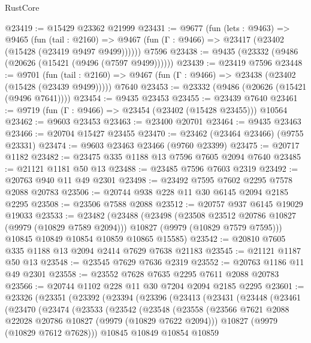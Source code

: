 \begin{lexlean}{RustCore}
\begin{coremodule}
@23419 := @15429 @23362 @21999
@23431 := @9677
    (fun (lets : @9463) =>
    @9465
      (fun (tail : @2160) =>
      @9467 (fun (Γ : @9466) => @23417 (@23402 (@15428 (@23419 @9497 @9499))))))
    @7596
@23438 := @9435 (@23332 (@9486 (@20626 (@15421 (@9496 (@7597 @9499))))))
@23439 := @23419 @7596
@23448 := @9701
    (fun (tail : @2160) => @9467 (fun (Γ : @9466) => @23438 (@23402 (@15428 (@23439 @9499)))))
    @7640
@23453 := @23332 (@9486 (@20626 (@15421 (@9496 @7641))))
@23454 := @9435 @23453
@23455 := @23439 @7640
@23461 := @9719 (fun (Γ : @9466) => @23454 (@23402 (@15428 @23455))) @10564
@23462 := @9603 @23453
@23463 := @23400 @20701
@23464 := @9435 @23463
@23466 := @20704 @15427 @23455
@23470 := @23462 (@23464 @23466) (@9755 @23331)
@23474 := @9603 @23463 @23466 (@9760 @23399)
@23475 := @20717 @1182
@23482 := @23475 @335 @1188 @13 @7596 @7605 @2094 @7640
@23485 := @21121 @1181 @50 @13
@23488 := @23485 @7596 @7603 @2319
@23492 := @20763 @940 @11 @49 @2301
@23498 := @23492 @7595 @7602 @2295 @7578 @2088 @20783
@23506 := @20744 @938 @228 @11 @30 @6145 @2094 @2185 @2295
@23508 := @23506 @7588 @2088
@23512 := @20757 @937 @6145 @19029 @19033
@23533 := @23482
    (@23488
      (@23498
        (@23508 @23512 @20786 @10827 (@9979 (@10829 @7589 @2094)))
        @10827
        (@9979 (@10829 @7579 @7595)))
      @10845
      @10849
      @10854
      @10859
      @10865
      @15585)
@23542 := @20810 @7605 @335 @1188 @13 @2094 @2414 @7629 @7638 @21183
@23545 := @21121 @1187 @50 @13
@23548 := @23545 @7629 @7636 @2319
@23552 := @20763 @1186 @11 @49 @2301
@23558 := @23552 @7628 @7635 @2295 @7611 @2088 @20783
@23566 := @20744 @1102 @228 @11 @30 @7204 @2094 @2185 @2295
@23601 := @23326
    (@23351
      (@23392
        (@23394
          (@23396
            (@23413
              (@23431
                (@23448
                  (@23461
                    (@23470
                      (@23474
                        (@23533
                          (@23542
                            (@23548
                              (@23558
                                (@23566
                                  @7621
                                  @2088
                                  @22028
                                  @20786
                                  @10827
                                  (@9979 (@10829 @7622 @2094)))
                                @10827
                                (@9979 (@10829 @7612 @7628)))
                              @10845
                              @10849
                              @10854
                              @10859

\end{coremodule}
\end{lexlean}
